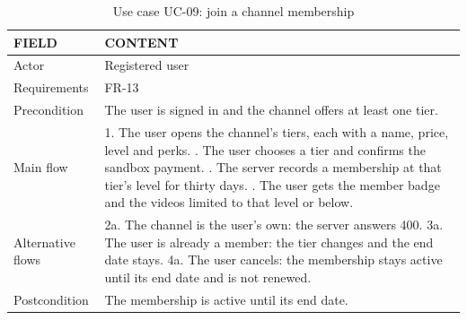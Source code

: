 \begin{table}[H]
\centering
\caption{Use case UC-09: join a channel membership}
\label{tab:uc-join}
\small
\begin{tabularx}{\textwidth}{p{} X}
\toprule
\textbf{FIELD} & \textbf{CONTENT} \\
\midrule
Actor & Registered user \\
Requirements & FR-13 \\
Precondition & The user is signed in and the channel offers at least one tier. \\
Main flow &
  1. The user opens the channel's tiers, each with a name, price, level and perks. \newline
  2. The user chooses a tier and confirms the sandbox payment. \newline
  3. The server records a membership at that tier's level for thirty days. \newline
  4. The user gets the member badge and the videos limited to that level or below. \\
Alternative flows &
  2a. The channel is the user's own: the server answers 400. \newline
  3a. The user is already a member: the tier changes and the end date stays. \newline
  4a. The user cancels: the membership stays active until its end date and is not renewed. \\
Postcondition & The membership is active until its end date. \\
\bottomrule
\end{tabularx}
\end{table}

